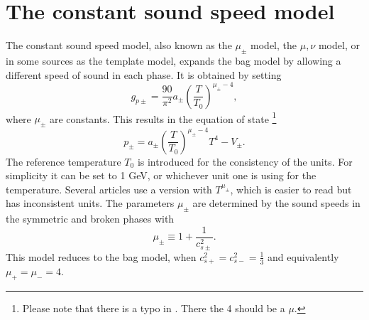\section{The constant sound speed model}
\label{const_cs}
The constant sound speed model, also known as the $\mu_\pm$ model, the $\mu, \nu$ model,
or in some sources as the template model,
expands the bag model by allowing a different speed of sound in each phase.
\cites{leitao_hydrodynamics_2015}{giese_2020}{giese_2021}
It is obtained by setting
\begin{equation}
g_{p\pm} = \frac{90}{\pi^2} a_\pm \left( \frac{T}{T_0} \right)^{\mu_\pm - 4},
\end{equation}
where $\mu_\pm$ are constants.
This results in the equation of state
\cites[eq. 15]{giese_2021}[eq. 38]{giese_2020}%
\footnote{Please note that there is a typo in \cite[eq. 15]{giese_2021}. There the 4 should be a $\mu$.}
\begin{equation}
p_\pm = a_\pm \left( \frac{T}{T_0} \right)^{\mu_\pm - 4} T^4 - V_\pm.
\end{equation}
The reference temperature $T_0$ is introduced for the consistency of the units.
For simplicity it can be set to 1 GeV, or whichever unit one is using for the temperature.
Several articles use a version with $T^{\mu_\pm}$, which is easier to read but has inconsistent units.
The parameters $\mu_\pm$ are determined by the sound speeds in the symmetric and broken phases with
\cites[eq. 16]{giese_2021}[eq. 39]{giese_2020}
\begin{equation}
\mu_\pm \equiv 1 + \frac{1}{c_{s\pm}^2}.
\end{equation}
This model reduces to the bag model,
when $c_{s+}^2 = c_{s-}^2 = \frac{1}{3}$
and equivalently
$\mu_+ = \mu_- = 4$.

